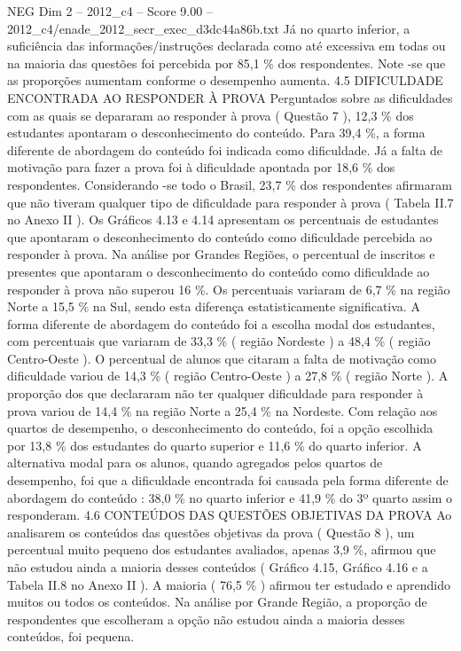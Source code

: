 \begin{textsample}{NEG Dim 2 – 2012\_c4 – Score 9.00 – 2012\_c4/enade\_2012\_secr\_exec\_d3dc44a86b.txt}
Já no quarto inferior, a suficiência das informações/instruções declarada como até excessiva em todas ou na maioria das questões foi percebida por 85,1 \% dos respondentes.
Note -se que as proporções aumentam conforme o desempenho aumenta. 4.5 DIFICULDADE ENCONTRADA AO RESPONDER À PROVA Perguntados sobre as dificuldades com as quais se depararam ao responder à prova ( Questão 7 ), 12,3 \% dos estudantes apontaram o desconhecimento do conteúdo.
Para 39,4 \%, a forma diferente de abordagem do conteúdo foi indicada como dificuldade.
Já a falta de motivação para fazer a prova foi à dificuldade apontada por 18,6 \% dos respondentes.
Considerando -se todo o Brasil, 23,7 \% dos respondentes afirmaram que não tiveram qualquer tipo de dificuldade para responder à prova ( Tabela II.7 no Anexo II ).
Os Gráficos 4.13 e 4.14 apresentam os percentuais de estudantes que apontaram o desconhecimento do conteúdo como dificuldade percebida ao responder à prova.
Na análise por Grandes Regiões, o percentual de inscritos e presentes que apontaram o desconhecimento do conteúdo como dificuldade ao responder à prova não superou 16 \%.
Os percentuais variaram de 6,7 \% na região Norte a 15,5 \% na Sul, sendo esta diferença estatisticamente significativa.
A forma diferente de abordagem do conteúdo foi a escolha modal dos estudantes, com percentuais que variaram de 33,3 \% ( região Nordeste ) a 48,4 \% ( região Centro-Oeste ).
O percentual de alunos que citaram a falta de motivação como dificuldade variou de 14,3 \% ( região Centro-Oeste ) a 27,8 \% ( região Norte ).
A proporção dos que declararam não ter qualquer dificuldade para responder à prova variou de 14,4 \% na região Norte a 25,4 \% na Nordeste.
Com relação aos quartos de desempenho, o desconhecimento do conteúdo, foi a opção escolhida por 13,8 \% dos estudantes do quarto superior e 11,6 \% do quarto inferior.
A alternativa modal para os alunos, quando agregados pelos quartos de desempenho, foi que a dificuldade encontrada foi causada pela forma diferente de abordagem do conteúdo : 38,0 \% no quarto inferior e 41,9 \% do 3º quarto assim o responderam. 4.6 CONTEÚDOS DAS QUESTÕES OBJETIVAS DA PROVA Ao analisarem os conteúdos das questões objetivas da prova ( Questão 8 ), um percentual muito pequeno dos estudantes avaliados, apenas 3,9 \%, afirmou que não estudou ainda a maioria desses conteúdos ( Gráfico 4.15, Gráfico 4.16 e a Tabela II.8 no Anexo II ).
A maioria ( 76,5 \% ) afirmou ter estudado e aprendido muitos ou todos os conteúdos.
Na análise por Grande Região, a proporção de respondentes que escolheram a opção não estudou ainda a maioria desses conteúdos, foi pequena.

\end{textsample}
